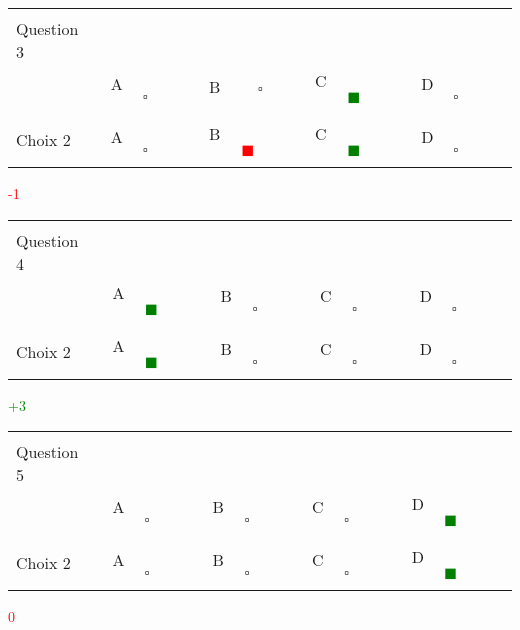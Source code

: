\documentclass{book}%
\begin{document}
\begin{center}%
\begin{tabular}{| l  l  l  l  l |}%
\hline%
 & & & & \\%
Question 3\qquad \qquad\ & & & & \\%
& A $\qquad \square \qquad$& B $\qquad \square \qquad$& C \textcolor{green}{$\qquad \blacksquare \qquad$}& D $\qquad \square \qquad$\\%
 & & & & \\%
\hline%
 & & & &  \\%
Choix 2& A $\qquad \square \qquad$& B \textcolor{red}{$\qquad \blacksquare \qquad$}& C \textcolor{green}{$\qquad \blacksquare \qquad$}& D $\qquad \square \qquad$\\%
 & & & &  \\%
\hline%
\end{tabular}%
 \qquad  \textcolor{red}{-1}%
\\ \vskip3mm%
\end{center}%
\thispagestyle{empty}%
\begin{center}%
\begin{tabular}{| l  l  l  l  l |}%
\hline%
 & & & & \\%
Question 4\qquad \qquad\ & & & & \\%
& A \textcolor{green}{$\qquad \blacksquare \qquad$}& B $\qquad \square \qquad$& C $\qquad \square \qquad$& D $\qquad \square \qquad$\\%
 & & & & \\%
\hline%
 & & & &  \\%
Choix 2& A \textcolor{green}{$\qquad \blacksquare \qquad$}& B $\qquad \square \qquad$& C $\qquad \square \qquad$& D $\qquad \square \qquad$\\%
 & & & &  \\%
\hline%
\end{tabular}%
 \qquad  \textcolor{green}{+3}%
\\ \vskip3mm%
\end{center}%
\thispagestyle{empty}%
\begin{center}%
\begin{tabular}{| l  l  l  l  l |}%
\hline%
 & & & & \\%
Question 5\qquad \qquad\ & & & & \\%
& A $\qquad \square \qquad$& B $\qquad \square \qquad$& C $\qquad \square \qquad$& D \textcolor{green}{$\qquad \blacksquare \qquad$}\\%
 & & & & \\%
\hline%
 & & & &  \\%
Choix 2& A $\qquad \square \qquad$& B $\qquad \square \qquad$& C $\qquad \square \qquad$& D \textcolor{green}{$\qquad \blacksquare \qquad$}\\%
 & & & &  \\%
\hline%
\end{tabular}%
 \qquad  \textcolor{red}{0}%
\\ \vskip3mm%
\end{center}%
\end{document}
